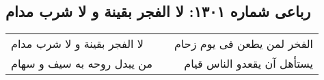 \begin{center}
\section*{رباعی شماره ۱۳۰۱: لا الفجر بقینة و لا شرب مدام}
\label{sec:1301}
\begin{longtable}{l p{0.5cm} r}
لا الفجر بقینة و لا شرب مدام
&&
الفخر لمن یطعن فی یوم زحام
\\
من یبدل روحه به سیف و سهام
&&
یستأهل آن یقعدو الناس قیام
\\
\end{longtable}
\end{center}
